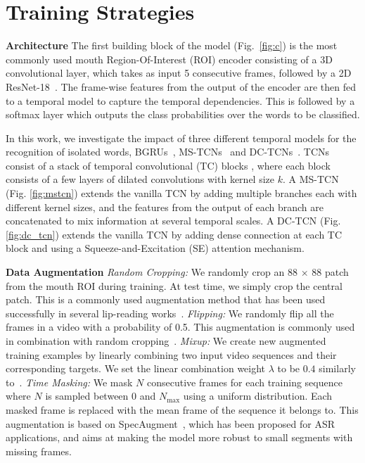 \documentclass{article}
\begin{document}
\section{Training Strategies }
\noindent\textbf{Architecture}\quad
The first building block of the model (Fig.~\ref{fig:c}) is the most commonly used mouth Region-Of-Interest (ROI) encoder consisting of a 3D convolutional layer, which takes as input 5 consecutive frames, followed by a 2D ResNet-18~\cite{stafylakis2017combining}. The frame-wise features from the output of the encoder are then fed to a temporal model to capture the temporal dependencies. This is followed by a softmax layer which outputs the class probabilities over the words to be classified.

In this work, we investigate the impact of three different temporal models for the recognition of isolated words, BGRUs~\cite{petridis2018end}, MS-TCNs~\cite{martinez2020lipreading} and DC-TCNs~\cite{ma2021lip}.  TCNs consist of a stack of temporal convolutional (TC) blocks , where each block consists of a few layers of dilated convolutions with kernel size $k$. A MS-TCN (Fig. \ref{fig:mstcn}) extends the vanilla TCN by adding multiple branches each with different kernel sizes, and the features from the output of each branch are concatenated to mix information at several temporal scales. A DC-TCN (Fig. \ref{fig:dc_tcn}) extends the vanilla TCN by adding dense connection at each TC block and using a Squeeze-and-Excitation (SE) attention mechanism.

\noindent\textbf{Data Augmentation}\label{ssec:DataAugm}\quad
\textit{Random Cropping:} We randomly crop an 88 $\times$ 88 patch from the mouth ROI during training. At test time, we simply crop the central patch. This is a commonly used augmentation method that has been used successfully in several lip-reading works~\cite{martinez2020lipreading, petridis2018end}.    
\textit{Flipping:} We randomly flip all the frames in a video with a probability of 0.5. This augmentation is commonly used in combination with random cropping~\cite{martinez2020lipreading, petridis2018end}.  
\textit{Mixup:} We create new augmented training examples by linearly combining two input video sequences  and their corresponding targets. 
We set the linear combination weight $\lambda$ to be $0.4$ similarly to~\cite{ma2020towards}.
\textit{Time Masking:} We mask $N$ consecutive frames for each training sequence where $N$ is sampled between $0$ and $N_{\text{max}}$ using a uniform distribution. Each masked frame is replaced with the mean frame of the sequence it belongs to. This augmentation is based on SpecAugment~\cite{DBLP:conf/interspeech/ParkCZCZCL19}, which has been proposed for ASR applications, and aims at making the model more robust to small segments with missing frames.  
\end{document}
